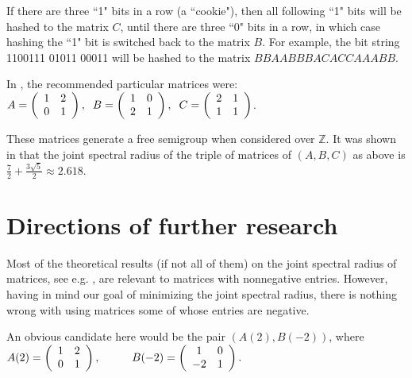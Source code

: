 \documentclass{lmsedition}
\newcommand{\Z}{\mathbb{Z}}
\begin{document}
\begin{twoblock}
\medskip

 If there are three ``1" bits in a row (a ``cookie"), then all following ``1" bits will be hashed to the matrix $C$, until there are three ``0" bits in a row, in which case hashing the ``1" bit is switched back to the matrix $B$.
For example, the bit string 1100111 01011 00011 will be hashed to the matrix $BBAABBB ACACC AAABB$.

\noindent In \cite{cookies}, the recommended particular matrices were: $A = \left(
 \begin{array}{cc} 1 & 2 \\ 0 & 1 \end{array} \right) , \hskip .2cm B = \left(
 \begin{array}{cc} 1 & 0 \\ 2 & 1 \end{array} \right), \hskip .2cm C = \left(
 \begin{array}{cc} 2 & 1 \\ 1 & 1 \end{array} \right)$.

These matrices generate a free semigroup when considered over $\Z$. It was shown in \cite{cookies} that the joint spectral radius of the triple of matrices of $(A, B, C)$ as above is $\frac{7}{2}+\frac{3\sqrt{5}}{2} \approx 2.618$.





\section*{Directions of further research}\label{Directions}

Most of the theoretical results (if not all of them) on the joint spectral radius of matrices, see e.g. \cite{Jungers}, are relevant to matrices with nonnegative entries. However, having in mind our goal of minimizing the joint spectral radius, there is nothing wrong with using matrices some of whose entries are negative. 

An obvious candidate here would be the pair $(A(2), B(-2))$, where $A(2) = \left(
 \begin{array}{cc} 1 & 2 \\ 0 & 1 \end{array} \right) , \hskip 1cm B(-2) = \left(
 \begin{array}{cc} 1 & 0 \\ -2 & 1 \end{array} \right).$


\end{twoblock}
\end{document}
